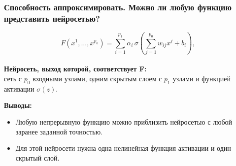 \documentclass[10pt]{beamer}
\begin{document}
\begin{frame}
\frametitle{Способность аппроксимировать. Можно ли любую функцию представить нейросетью?}

\begin{equation*}
F(x^1, \ldots, x^{p_0})=\sum_{i=1}^{p_1} \alpha_i \, \sigma \left(\sum_{j=1}^{p_0} w_{ij} x^j + b_i   \right),
\end{equation*}
\\
\vspace{0.5cm} 
\textbf{Нейросеть, выход которой, соответствует F:}\\
сеть с $p_0$ входными узлами, одним скрытым слоем с $p_1$ узлами и функцией активации $\sigma(z)$. \\
\vspace{0.5cm} 

\textbf{Выводы:} 
\begin{itemize}
\item Любую непрерывную функцию можно приблизить нейросетью с любой заранее заданной точностью. 
\item Для этой нейросети нужна одна нелинейная функция активации и один скрытый слой.
\end{itemize}

\end{frame}
\end{document}
